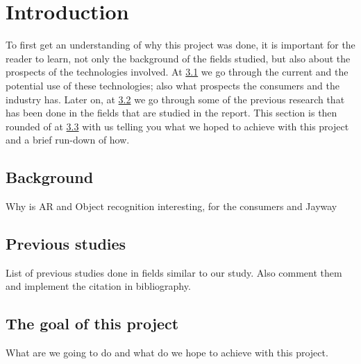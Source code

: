 \section{Introduction}
To first get an understanding of why this project was done, it is important for the reader to learn, not only the background of the fields studied, but also about the prospects of the technologies involved.
 At \hyperref[subsec:Background]{3.1} we go through the current and the potential use of these technologies; also what prospects the consumers and the industry has. Later on, at  \hyperref[subsec:PrevStud]{3.2} we go through some of the previous research that has been done in the fields that are studied in the report. This section is then rounded of at \hyperref[subsec:Goal]{3.3} with us telling you what we hoped to achieve with this project and a brief run-down of how.

\subsection{Background}
\label{subsec:Background}
Why is AR and Object recognition interesting, for the consumers and Jayway



\subsection{Previous studies}
\label{subsec:PrevStud}
List of previous studies done in fields similar to our study. Also comment them and implement the citation in bibliography.




\subsection{The goal of this project}
\label{subsec:Goal}

What are we going to do and what do we hope to achieve with this project.

\newpage
